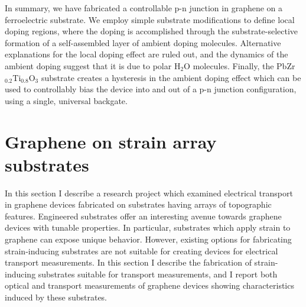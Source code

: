 \documentclass[edeposit,fullpage,draftthesis]{uiucthesis2009}
\begin{document}
        In summary, we have fabricated a controllable p-n junction in graphene on a ferroelectric substrate. We employ simple substrate modifications to define local doping regions, where the doping is accomplished through the substrate-selective formation of a self-assembled layer of ambient doping molecules. Alternative explanations for the local doping effect are ruled out, and the dynamics of the ambient doping suggest that it is due to polar H$_2$O molecules. Finally, the PbZr$_{0.2}$Ti$_{0.8}$O$_3$ substrate creates a hysteresis in the ambient doping effect which can be used to controllably bias the device into and out of a p-n junction configuration, using a single, universal backgate.




\pagebreak
\section{Graphene on strain array substrates}
\label{sec:res:strain}

            
    In this section I describe a research project which examined electrical transport in graphene
    devices fabricated on substrates having arrays of topographic features.
    Engineered substrates offer an interesting avenue towards graphene devices with tunable properties.
    In particular, substrates which apply strain to graphene can expose unique behavior.
    However, existing options for fabricating strain-inducing substrates are not suitable for creating 
    devices for electrical transport measurements.
    In this section I describe the fabrication of strain-inducing substrates suitable for transport measurements,
    and I report both optical and transport measurements of graphene devices showing characteristics induced by these substrates.
            
\end{document}
